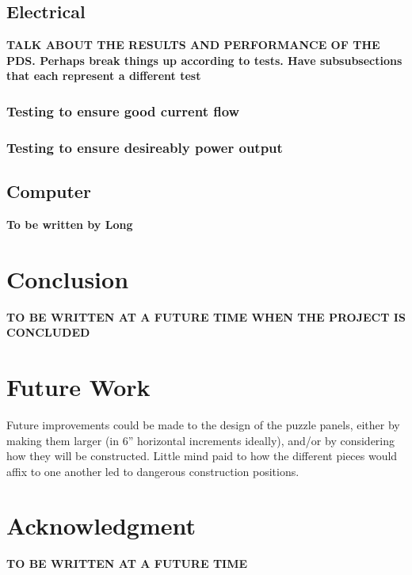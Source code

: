 \documentclass[conference]{IEEEtran}
\begin{document}
	\subsection{Electrical}
	\textbf{TALK ABOUT THE RESULTS AND PERFORMANCE OF THE PDS. Perhaps break things up according to tests. Have subsubsections that each represent a different test}
		\subsubsection{Testing to ensure good current flow}
		\subsubsection{Testing to ensure desireably power output}
		
	\subsection{Computer}
	\textbf{To be written by Long}

\section{Conclusion}
	\textbf{TO BE WRITTEN AT A FUTURE TIME WHEN THE PROJECT IS CONCLUDED}

\section{Future Work}
Future improvements could be made to the design of the puzzle panels, either by making them larger (in 6'' horizontal increments ideally), and/or by considering how they will be constructed. Little mind paid to how the different pieces would affix to one another led to dangerous construction positions.

\section*{Acknowledgment} 
	\textbf{TO BE WRITTEN AT A FUTURE TIME}
\end{document}
